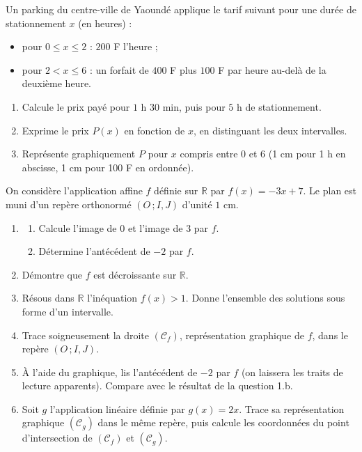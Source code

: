 \documentclass[11pt]{article}
\newcounter{popsec}
\newcounter{popsub}
\newcommand{\courssub}[1]{%
  \stepcounter{popsub}%
  \par\vspace{9pt}\noindent{\popxbold\fontsize{11.5}{13}\selectfont\color{popink}{\color{poporange}\thepopsec.\thepopsub}\hspace{6pt}#1}\par\nopagebreak\vspace{4pt}
}
\begin{document}
\begin{exercice}
Un parking du centre-ville de Yaoundé applique le tarif suivant pour une durée de stationnement $x$ (en heures) :
\begin{itemize}
\item pour $0\le x\le 2$ : $200$ F l'heure ;
\item pour $2<x\le 6$ : un forfait de $400$ F plus $100$ F par heure au-delà de la deuxième heure.
\end{itemize}
\begin{enumerate}
\item Calcule le prix payé pour $1$ h $30$ min, puis pour $5$ h de stationnement.
\item Exprime le prix $P(x)$ en fonction de $x$, en distinguant les deux intervalles.
\item Représente graphiquement $P$ pour $x$ compris entre $0$ et $6$ (1 cm pour 1 h en abscisse, 1 cm pour 100 F en ordonnée).
\end{enumerate}
\end{exercice}

\courssub{Je me prépare au BEPC}

\begin{exercice}
On considère l'application affine $f$ définie sur $\mathbb{R}$ par $f(x)=-3x+7$. Le plan est muni d'un repère orthonormé $(O\,;I,J)$ d'unité $1$ cm.
\begin{enumerate}
\item \begin{enumerate}
\item Calcule l'image de $0$ et l'image de $3$ par $f$.
\item Détermine l'antécédent de $-2$ par $f$.
\end{enumerate}
\item Démontre que $f$ est décroissante sur $\mathbb{R}$.
\item Résous dans $\mathbb{R}$ l'inéquation $f(x)>1$. Donne l'ensemble des solutions sous forme d'un intervalle.
\item Trace soigneusement la droite $(\mathcal{C}_f)$, représentation graphique de $f$, dans le repère $(O\,;I,J)$.
\item À l'aide du graphique, lis l'antécédent de $-2$ par $f$ (on laissera les traits de lecture apparents). Compare avec le résultat de la question 1.b.
\item Soit $g$ l'application linéaire définie par $g(x)=2x$. Trace sa représentation graphique $(\mathcal{C}_g)$ dans le même repère, puis calcule les coordonnées du point d'intersection de $(\mathcal{C}_f)$ et $(\mathcal{C}_g)$.
\end{enumerate}
\end{exercice}
\end{document}
